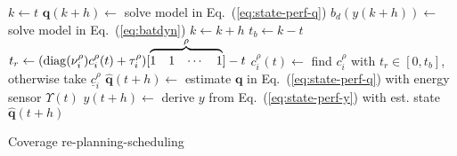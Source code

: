 \documentclass[letterpaper,10pt,journal,twoside]{IEEEtran}
\theoremstyle{definition}
\begin{document}
\begin{algorithm}[t]
\begin{algorithmic}[1]
      \vspace*{.8ex}
      \color{black}\STATE $k\gets t$\vspace*{.3ex}\label{alg:bat1}
      \vspace*{.3ex}
          \STATE $\mathbf{q}(k+h)\gets${ solve model in Eq.~(\ref{eq:state-perf-q})}\vspace*{.3ex}\label{alg:evol}
        \ENDIF
        \STATE $b_d(y(k+h))\gets${ solve model in Eq.~(\ref{eq:batdyn})}\vspace*{.3ex}
        \STATE $k\gets k+h$\vspace*{.3ex}
      \ENDWHILE
      \STATE $t_b\gets k-t$\vspace*{.3ex}\label{alg:bat2}
      \vspace*{-2.4ex}
      \color{blue}\STATE $t_r\gets (\mathrm{diag}(\nu_i^\rho)\vspace*{.3ex}c_i^\rho(t)+\tau_i^\rho)[\overbrace{\begin{matrix}1&1&\cdots&1\end{matrix}}^{\rho}]-t$\vspace*{.3ex}\label{alg:traj1}
        \color{blue}\STATE $c_i^{\rho}(t)\gets${ find }$c_i^{\rho}${ with }$t_r\in[0,t_b]${, otherwise take }$\underline{c}_i^\rho$\vspace*{.3ex}\label{alg:traj2}
      \color{black}\ENDIF
      \vspace*{.8ex}
      \color{black}\STATE $\hat{\mathbf{q}}(t+h)\gets${ estimate }$\mathbf{q}${ in Eq.~(\ref{eq:state-perf-q}) with energy sensor }$\Upsilon(t)$\vspace*{.3ex}\label{alg:klm1}
      \color{black}\STATE $\hat{y}(t+h)\gets${ derive }$y${ from Eq.~(\ref{eq:state-perf-y}) with est. state }$\hat{\mathbf{q}}(t+h)$\vspace*{.3ex}\label{alg:klm2}
    \ENDFOR
  \end{algorithmic}
  \caption{Coverage re-planning-scheduling}\label{alg}
\end{algorithm}
\end{document}
